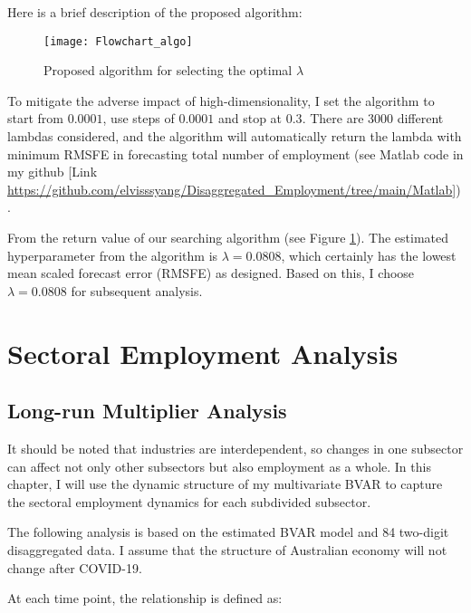 \documentclass{monashthesis}
\begin{document}
Here is a brief description of the proposed algorithm:

\graphicspath{ {/Users/elvisyang/Desktop/hon_proj/Disaggregated_Employment/Honours_thesis/figures} }

\begin{figure}[ht]
\texttt{[image: Flowchart\_algo]}
\centering
\caption{Proposed algorithm for selecting the optimal $\lambda$}
\label{fig:sealgo}
\end{figure}

To mitigate the adverse impact of high-dimensionality, I set the algorithm to start from \(0.0001\), use steps of \(0.0001\) and stop at \(0.3\). There are 3000 different lambdas considered, and the algorithm will automatically return the lambda with minimum RMSFE in forecasting total number of employment (see Matlab code in my github {[}Link \url{https://github.com/elvisssyang/Disaggregated_Employment/tree/main/Matlab}{]}).

From the return value of our searching algorithm (see Figure \ref{fig:sealgo}). The estimated hyperparameter from the algorithm is \(\lambda=0.0808\), which certainly has the lowest mean scaled forecast error (RMSFE) as designed. Based on this, I choose \(\lambda=0.0808\) for subsequent analysis.

\newpage

\hypertarget{sectoral-employment-analysis}{%
\chapter{Sectoral Employment Analysis}\label{sectoral-employment-analysis}}

\hypertarget{long-run-multiplier-analysis}{%
\section{Long-run Multiplier Analysis}\label{long-run-multiplier-analysis}}

It should be noted that industries are interdependent, so changes in one subsector can affect not only other subsectors but also employment as a whole. In this chapter, I will use the dynamic structure of my multivariate BVAR to capture the sectoral employment dynamics for each subdivided subsector.

The following analysis is based on the estimated BVAR model and 84 two-digit disaggregated data. I assume that the structure of Australian economy will not change after COVID-19.

At each time point, the relationship is defined as:
\end{document}
